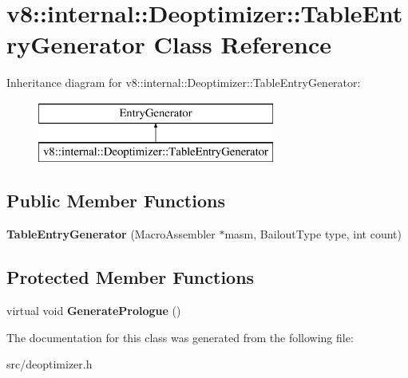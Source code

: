\hypertarget{classv8_1_1internal_1_1_deoptimizer_1_1_table_entry_generator}{}\section{v8\+:\+:internal\+:\+:Deoptimizer\+:\+:Table\+Entry\+Generator Class Reference}
\label{classv8_1_1internal_1_1_deoptimizer_1_1_table_entry_generator}
Inheritance diagram for v8\+:\+:internal\+:\+:Deoptimizer\+:\+:Table\+Entry\+Generator\+:\begin{figure}[H]
\begin{center}
\leavevmode
\includegraphics[height=2.000000cm]{classv8_1_1internal_1_1_deoptimizer_1_1_table_entry_generator}
\end{center}
\end{figure}
\subsection*{Public Member Functions}
\begin{DoxyCompactItemize}
\item 
\hypertarget{classv8_1_1internal_1_1_deoptimizer_1_1_table_entry_generator_a87f52923286fff085069d1f27060a35d}{}{\bfseries Table\+Entry\+Generator} (Macro\+Assembler $\ast$masm, Bailout\+Type type, int count)\label{classv8_1_1internal_1_1_deoptimizer_1_1_table_entry_generator_a87f52923286fff085069d1f27060a35d}

\end{DoxyCompactItemize}
\subsection*{Protected Member Functions}
\begin{DoxyCompactItemize}
\item 
\hypertarget{classv8_1_1internal_1_1_deoptimizer_1_1_table_entry_generator_afb6262d54c3e10669dc52662463254c2}{}virtual void {\bfseries Generate\+Prologue} ()\label{classv8_1_1internal_1_1_deoptimizer_1_1_table_entry_generator_afb6262d54c3e10669dc52662463254c2}

\end{DoxyCompactItemize}


The documentation for this class was generated from the following file\+:\begin{DoxyCompactItemize}
\item 
src/deoptimizer.\+h\end{DoxyCompactItemize}
